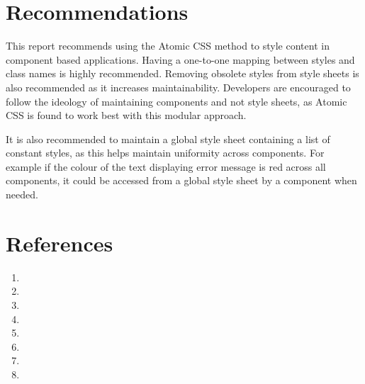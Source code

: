 \documentclass[12pt]{article}
\begin{document}
\newpage

\section{Recommendations}
This report recommends using the Atomic CSS method to style content in component based applications. Having a one-to-one mapping between styles and class names is highly recommended. Removing obsolete styles from style sheets is also recommended as it increases maintainability. Developers are encouraged to follow the ideology of maintaining components and not style sheets, as Atomic CSS is found to work best with this modular approach.

It is also recommended to maintain a global style sheet containing a list of constant styles, as this helps maintain uniformity across components. For example if the colour of the text displaying error message is red across all components, it could be accessed from a global style sheet by a component when needed. 

\newpage

\section{References}

\begin{enumerate}

	\item {}

	\item {}

	\item {}

	\item {}

	\item {}

	\item {}

	\item {}

	\item {}

\end{enumerate}
\end{document}
